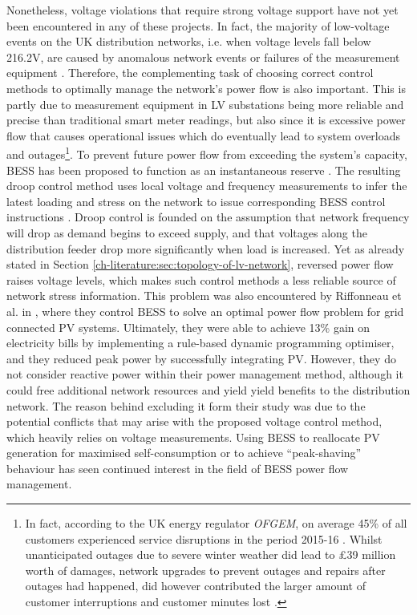 Nonetheless, voltage violations that require strong voltage support have not yet been encountered in any of these projects.
In fact, the majority of low-voltage events on the UK distribution networks, i.e. when voltage levels fall below 216.2V, are caused by anomalous network events or failures of the measurement equipment \cite{UKPowerNetworks2014a}.
Therefore, the complementing task of choosing correct control methods to optimally manage the network's power flow is also important.
This is partly due to measurement equipment in LV substations being more reliable and precise than traditional smart meter readings, but also since it is excessive power flow that causes operational issues which do eventually lead to system overloads and outages\footnote{%
In fact, according to the UK energy regulator \textit{OFGEM}, on average 45\% of all customers experienced service disruptions in the period 2015-16 \cite{Ofgem2017}.
Whilst unanticipated outages due to severe winter weather did lead to \pounds39 million worth of damages, network upgrades to prevent outages and repairs after outages had happened, did however contributed the larger amount of customer interruptions and customer minutes lost \cite{Ofgem2014}.%
}.
To prevent future power flow from exceeding the system's capacity, BESS has been proposed to function as an instantaneous reserve \cite{Kunisch1986a, Kunisch1986}.
The resulting droop control method uses local voltage and frequency measurements to infer the latest loading and stress on the network to issue corresponding BESS control instructions \cite{Engler2005a}.
Droop control is founded on the assumption that network frequency will drop as demand begins to exceed supply, and that voltages along the distribution feeder drop more significantly when load is increased.
Yet as already stated in Section \ref{ch-literature:sec:topology-of-lv-network}, reversed power flow raises voltage levels, which makes such control methods a less reliable source of network stress information.
This problem was also encountered by Riffonneau et al. in \cite{Riffonneau2011}, where they control BESS to solve an optimal power flow problem for grid connected PV systems.
Ultimately, they were able to achieve 13\% gain on electricity bills by implementing a rule-based dynamic programming optimiser, and they reduced peak power by successfully integrating PV.
However, they do not consider reactive power within their power management method, although it could free additional network resources and yield  yield benefits to the distribution network.
The reason behind excluding it form their study was due to the potential conflicts that may arise with the proposed voltage control method, which heavily relies on voltage measurements.
Using BESS to reallocate PV generation for maximised self-consumption \cite{SaniHassan2017} or to achieve ``peak-shaving'' behaviour \cite{Bennett2015a, DePaola2016} has seen continued interest in the field of BESS power flow management.

